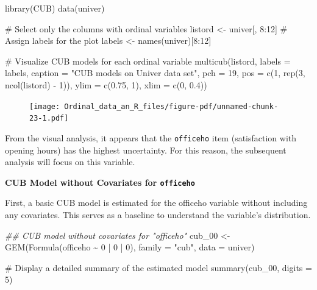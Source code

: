 \documentclass[
  letterpaper,
  DIV=11,
  numbers=noendperiod]{scrartcl}
\newenvironment{Shaded}{\begin{snugshade}}{\end{snugshade}}
\newcommand{\AttributeTok}[1]{\textcolor[rgb]{0.40,0.45,0.13}{#1}}
\newcommand{\CommentTok}[1]{\textcolor[rgb]{0.37,0.37,0.37}{#1}}
\newcommand{\DecValTok}[1]{\textcolor[rgb]{0.68,0.00,0.00}{#1}}
\newcommand{\DocumentationTok}[1]{\textcolor[rgb]{0.37,0.37,0.37}{\textit{#1}}}
\newcommand{\FloatTok}[1]{\textcolor[rgb]{0.68,0.00,0.00}{#1}}
\newcommand{\FunctionTok}[1]{\textcolor[rgb]{0.28,0.35,0.67}{#1}}
\newcommand{\NormalTok}[1]{\textcolor[rgb]{0.00,0.23,0.31}{#1}}
\newcommand{\OtherTok}[1]{\textcolor[rgb]{0.00,0.23,0.31}{#1}}
\newcommand{\SpecialCharTok}[1]{\textcolor[rgb]{0.37,0.37,0.37}{#1}}
\newcommand{\StringTok}[1]{\textcolor[rgb]{0.13,0.47,0.30}{#1}}
\begin{document}
\begin{Shaded}
\begin{Highlighting}[]
\FunctionTok{library}\NormalTok{(CUB)}
\FunctionTok{data}\NormalTok{(univer)}

\CommentTok{\# Select only the columns with ordinal variables}
\NormalTok{listord }\OtherTok{\textless{}{-}}\NormalTok{ univer[, }\DecValTok{8}\SpecialCharTok{:}\DecValTok{12}\NormalTok{]}
\CommentTok{\# Assign labels for the plot}
\NormalTok{labels }\OtherTok{\textless{}{-}} \FunctionTok{names}\NormalTok{(univer)[}\DecValTok{8}\SpecialCharTok{:}\DecValTok{12}\NormalTok{]}

\CommentTok{\# Visualize CUB models for each ordinal variable}
\FunctionTok{multicub}\NormalTok{(listord, }\AttributeTok{labels =}\NormalTok{ labels,}
         \AttributeTok{caption =} \StringTok{"CUB models on Univer data set"}\NormalTok{, }\AttributeTok{pch =} \DecValTok{19}\NormalTok{,}
         \AttributeTok{pos =} \FunctionTok{c}\NormalTok{(}\DecValTok{1}\NormalTok{, }\FunctionTok{rep}\NormalTok{(}\DecValTok{3}\NormalTok{, }\FunctionTok{ncol}\NormalTok{(listord) }\SpecialCharTok{{-}} \DecValTok{1}\NormalTok{)), }\AttributeTok{ylim =} \FunctionTok{c}\NormalTok{(}\FloatTok{0.75}\NormalTok{, }\DecValTok{1}\NormalTok{), }\AttributeTok{xlim =} \FunctionTok{c}\NormalTok{(}\DecValTok{0}\NormalTok{, }\FloatTok{0.4}\NormalTok{))}
\end{Highlighting}
\end{Shaded}

\begin{figure}[H]

{\centering \texttt{[image: Ordinal\_data\_an\_R\_files/figure-pdf/unnamed-chunk-23-1.pdf]}

}

\end{figure}

From the visual analysis, it appears that the \texttt{officeho} item
(satisfaction with opening hours) has the highest uncertainty. For this
reason, the subsequent analysis will focus on this variable.

\textbf{CUB Model without Covariates for \texttt{officeho}}

First, a basic CUB model is estimated for the officeho variable without
including any covariates. This serves as a baseline to understand the
variable's distribution.

\begin{Shaded}
\begin{Highlighting}[]
\DocumentationTok{\#\# CUB model without covariates for "officeho"}
\NormalTok{cub\_00 }\OtherTok{\textless{}{-}} \FunctionTok{GEM}\NormalTok{(}\FunctionTok{Formula}\NormalTok{(officeho }\SpecialCharTok{\textasciitilde{}} \DecValTok{0} \SpecialCharTok{|} \DecValTok{0} \SpecialCharTok{|} \DecValTok{0}\NormalTok{), }\AttributeTok{family =} \StringTok{"cub"}\NormalTok{, }\AttributeTok{data =}\NormalTok{ univer)}

\CommentTok{\# Display a detailed summary of the estimated model}
\FunctionTok{summary}\NormalTok{(cub\_00, }\AttributeTok{digits =} \DecValTok{5}\NormalTok{)}
\end{Highlighting}
\end{Shaded}
\end{document}
